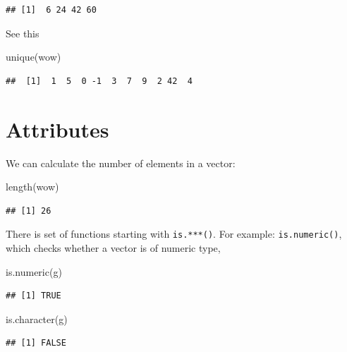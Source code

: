 \documentclass[
]{book}
\newenvironment{Shaded}{\begin{snugshade}}{\end{snugshade}}
\newcommand{\FunctionTok}[1]{\textcolor[rgb]{0.00,0.00,0.00}{#1}}
\newcommand{\NormalTok}[1]{#1}
\begin{document}
\begin{verbatim}
## [1]  6 24 42 60
\end{verbatim}

See this

\begin{Shaded}
\begin{Highlighting}[]
\FunctionTok{unique}\NormalTok{(wow)}
\end{Highlighting}
\end{Shaded}

\begin{verbatim}
##  [1]  1  5  0 -1  3  7  9  2 42  4
\end{verbatim}

\hypertarget{attributes}{%
\section{Attributes}\label{attributes}}

We can calculate the number of elements in a vector:

\begin{Shaded}
\begin{Highlighting}[]
\FunctionTok{length}\NormalTok{(wow)}
\end{Highlighting}
\end{Shaded}

\begin{verbatim}
## [1] 26
\end{verbatim}

There is set of functions starting with \texttt{is.***()}. For example: \texttt{is.numeric()}, which checks whether a vector is of numeric type,

\begin{Shaded}
\begin{Highlighting}[]
\FunctionTok{is.numeric}\NormalTok{(g)}
\end{Highlighting}
\end{Shaded}

\begin{verbatim}
## [1] TRUE
\end{verbatim}

\begin{Shaded}
\begin{Highlighting}[]
\FunctionTok{is.character}\NormalTok{(g)}
\end{Highlighting}
\end{Shaded}

\begin{verbatim}
## [1] FALSE
\end{verbatim}
\end{document}
